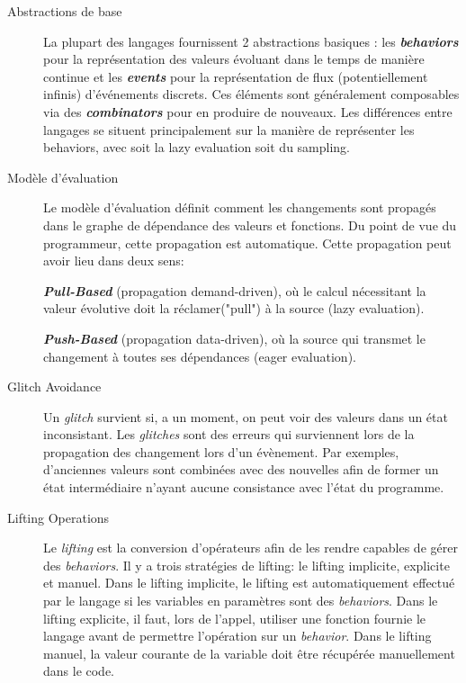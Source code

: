 \documentclass[10pt,final]{IEEEtran}
\begin{document}
\begin{description}
    \item[Abstractions de base]
    La plupart des langages fournissent 2 abstractions basiques : les \textbf{\textit{behaviors}} pour la représentation des valeurs évoluant dans le temps de manière continue et les \textbf{\textit{events}} pour la représentation de flux (potentiellement infinis) d'événements discrets. Ces éléments sont généralement composables via des \textbf{\textit{combinators}} pour en produire de nouveaux. Les différences entre langages se situent principalement sur la manière de représenter les behaviors, avec soit la lazy evaluation soit du sampling.
    
    \item[Modèle d'évaluation]
    Le modèle d'évaluation définit comment les changements sont propagés dans le graphe de dépendance des valeurs et fonctions. Du point de vue du programmeur, cette propagation est automatique. Cette propagation peut avoir lieu dans deux sens: 
    
    \textbf{\textit{Pull-Based}} (propagation demand-driven), où le calcul nécessitant la valeur évolutive doit la réclamer("pull") à la source (lazy evaluation).
    
    \textbf{\textit{Push-Based}} (propagation data-driven), où la source qui transmet le changement à toutes ses dépendances (eager evaluation).
    
    \item[Glitch Avoidance]
    Un \textit{glitch} survient si, a un moment, on peut voir des valeurs dans un état inconsistant. Les \textit{glitches} sont des erreurs qui surviennent lors de la propagation des changement lors d'un évènement. Par exemples, d'anciennes valeurs sont combinées avec des nouvelles afin de former un état intermédiaire n'ayant aucune consistance avec l'état du programme.
    
    \item[Lifting Operations]
    Le \textit{lifting} est la conversion d'opérateurs afin de les rendre capables de gérer des \textit{behaviors}. Il y a trois stratégies de lifting: le lifting implicite, explicite et manuel. Dans le lifting implicite, le lifting est automatiquement effectué par le langage si les variables en paramètres sont des \textit{behaviors}. Dans le lifting explicite, il faut, lors de l'appel, utiliser une fonction fournie le langage avant de permettre l'opération sur un \textit{behavior}. Dans le lifting manuel, la valeur courante de la variable doit être récupérée manuellement dans le code.
    

\end{description}
\end{document}
